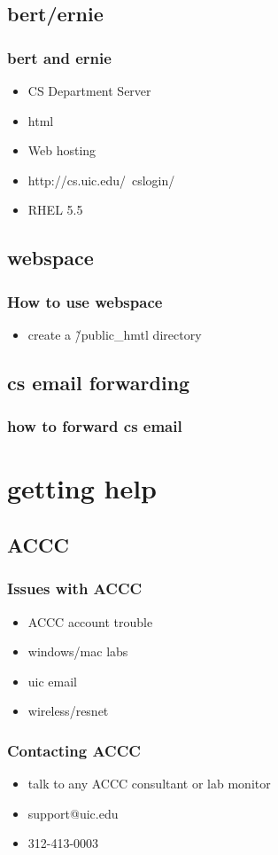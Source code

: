 \documentclass[hyperref={pdfpagelabels=false}]{beamer}
\begin{document}
\subsection{bert/ernie}
\frame
{
    \frametitle{bert and ernie}
    \begin{itemize}
    \item{CS Department Server}
    \item{html}
    \item{Web hosting}
    \item{http://cs.uic.edu/~cslogin/}
    \item{RHEL 5.5}
    \end{itemize}
}
\subsection{webspace}
\frame
{
    \frametitle{How to use webspace}
    \begin{itemize}
    \item{create a \~/public\_hmtl directory}
    \end{itemize}
}
\subsection{cs email forwarding}
\frame
{
    \frametitle{how to forward cs email}
}
\section{getting help}

\subsection{ACCC}
\frame
{
    \frametitle{Issues with ACCC}
    \begin{itemize}
    \item{ACCC account trouble}
    \item{windows/mac labs}
    \item{uic email}
    \item{wireless/resnet}
    \end{itemize}
}
\frame
{
    \frametitle{Contacting ACCC}
    \begin{itemize}
    \item{talk to any ACCC consultant or lab monitor}
    \item{support@uic.edu}
    \item{312-413-0003}
    \end{itemize}
}
\end{document}
